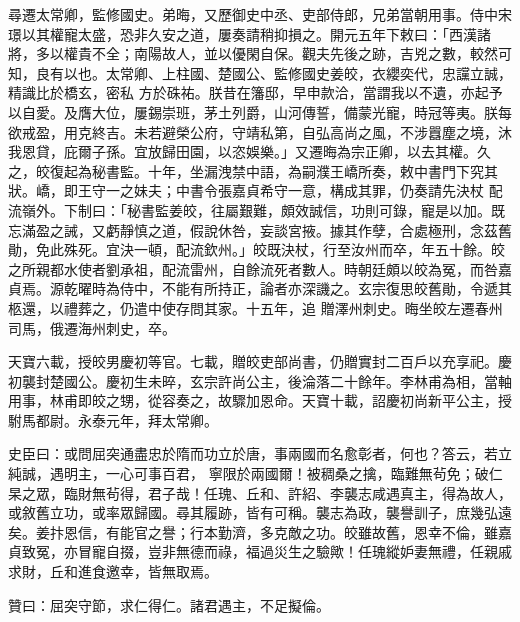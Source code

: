 \begin{pinyinscope}
 尋遷太常卿，監修國史。弟晦，又歷御史中丞、吏部侍郎，兄弟當朝用事。侍中宋璟以其權寵太盛，恐非久安之道，屢奏請稍抑損之。開元五年下敕曰：「西漢諸將，多以權貴不全；南陽故人，並以優閑自保。觀夫先後之跡，吉兇之數，較然可知，良有以也。太常卿、上柱國、楚國公、監修國史姜皎，衣纓奕代，忠讜立誠，精識比於橋玄，密私
 方於硃祐。朕昔在籓邸，早申款洽，當謂我以不遺，亦起予以自愛。及膺大位，屢錫崇班，茅土列爵，山河傳誓，備蒙光寵，時冠等夷。朕每欲戒盈，用克終吉。未若避榮公府，守靖私第，自弘高尚之風，不涉囂塵之境，沐我恩貸，庇爾子孫。宜放歸田園，以恣娛樂。」又遷晦為宗正卿，以去其權。久之，皎復起為秘書監。十年，坐漏洩禁中語，為嗣濮王嶠所奏，敕中書門下究其狀。嶠，即王守一之妹夫；中書令張嘉貞希守一意，構成其罪，仍奏請先決杖
 配流嶺外。下制曰：「秘書監姜皎，往屬艱難，頗效誠信，功則可錄，寵是以加。既忘滿盈之誡，又虧靜慎之道，假說休咎，妄談宮掖。據其作孽，合處極刑，念茲舊勛，免此殊死。宜決一頓，配流欽州。」皎既決杖，行至汝州而卒，年五十餘。皎之所親都水使者劉承祖，配流雷州，自餘流死者數人。時朝廷頗以皎為冤，而咎嘉貞焉。源乾曜時為侍中，不能有所持正，論者亦深譏之。玄宗復思皎舊勛，令遞其柩還，以禮葬之，仍遣中使存問其家。十五年，追
 贈澤州刺史。晦坐皎左遷春州司馬，俄遷海州刺史，卒。



 天寶六載，授皎男慶初等官。七載，贈皎吏部尚書，仍贈實封二百戶以充享祀。慶初襲封楚國公。慶初生未晬，玄宗許尚公主，後淪落二十餘年。李林甫為相，當軸用事，林甫即皎之甥，從容奏之，故驟加恩命。天寶十載，詔慶初尚新平公主，授駙馬都尉。永泰元年，拜太常卿。



 史臣曰：或問屈突通盡忠於隋而功立於唐，事兩國而名愈彰者，何也？答云，若立純誠，遇明主，一心可事百君，
 寧限於兩國爾！被稠桑之擒，臨難無茍免；破仁杲之眾，臨財無茍得，君子哉！任瑰、丘和、許紹、李襲志咸遇真主，得為故人，或敘舊立功，或率眾歸國。尋其履跡，皆有可稱。襲志為政，襲譽訓子，庶幾弘遠矣。姜抃恩信，有能官之譽；行本勤濟，多克敵之功。皎雖故舊，恩幸不倫，雖嘉貞致冤，亦冒寵自掇，豈非無德而祿，福過災生之驗歟！任瑰縱妒妻無禮，任親戚求財，丘和進食邀幸，皆無取焉。



 贊曰：屈突守節，求仁得仁。諸君遇主，不足擬倫。



\end{pinyinscope}